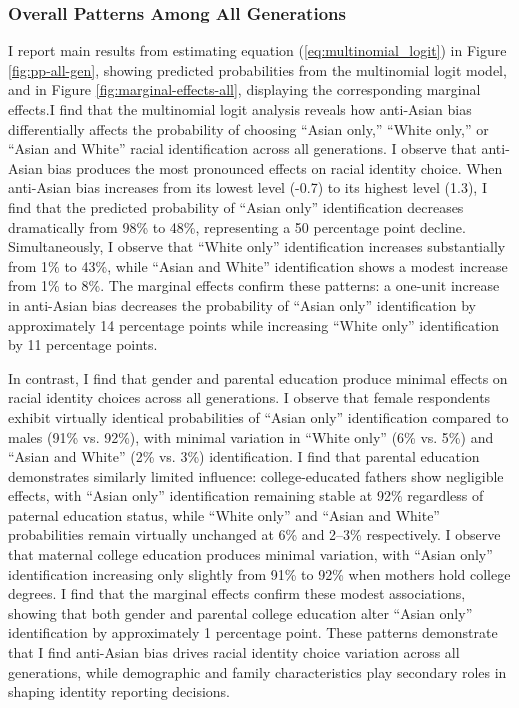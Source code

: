 \subsubsection*{Overall Patterns Among All Generations}

I report main results from estimating equation (\ref{eq:multinomial_logit}) in Figure \ref{fig:pp-all-gen}, showing predicted probabilities from the multinomial logit model, and in Figure \ref{fig:marginal-effects-all}, displaying the corresponding marginal effects.I find that the multinomial logit analysis reveals how anti-Asian bias differentially affects the probability of choosing ``Asian only,'' ``White only,'' or ``Asian and White'' racial identification across all generations. I observe that anti-Asian bias produces the most pronounced effects on racial identity choice. When anti-Asian bias increases from its lowest level (-0.7) to its highest level (1.3), I find that the predicted probability of ``Asian only'' identification decreases dramatically from 98\% to 48\%, representing a 50 percentage point decline. Simultaneously, I observe that ``White only'' identification increases substantially from 1\% to 43\%, while ``Asian and White'' identification shows a modest increase from 1\% to 8\%. The marginal effects confirm these patterns: a one-unit increase in anti-Asian bias decreases the probability of ``Asian only'' identification by approximately 14 percentage points while increasing ``White only'' identification by 11 percentage points.

In contrast, I find that gender and parental education produce minimal effects on racial identity choices across all generations. I observe that female respondents exhibit virtually identical probabilities of ``Asian only'' identification compared to males (91\% vs. 92\%), with minimal variation in ``White only'' (6\% vs. 5\%) and ``Asian and White'' (2\% vs. 3\%) identification. I find that parental education demonstrates similarly limited influence: college-educated fathers show negligible effects, with ``Asian only'' identification remaining stable at 92\% regardless of paternal education status, while ``White only'' and ``Asian and White'' probabilities remain virtually unchanged at 6\% and 2--3\% respectively. I observe that maternal college education produces minimal variation, with ``Asian only'' identification increasing only slightly from 91\% to 92\% when mothers hold college degrees. I find that the marginal effects confirm these modest associations, showing that both gender and parental college education alter ``Asian only'' identification by approximately 1 percentage point. These patterns demonstrate that I find anti-Asian bias drives racial identity choice variation across all generations, while demographic and family characteristics play secondary roles in shaping identity reporting decisions.

